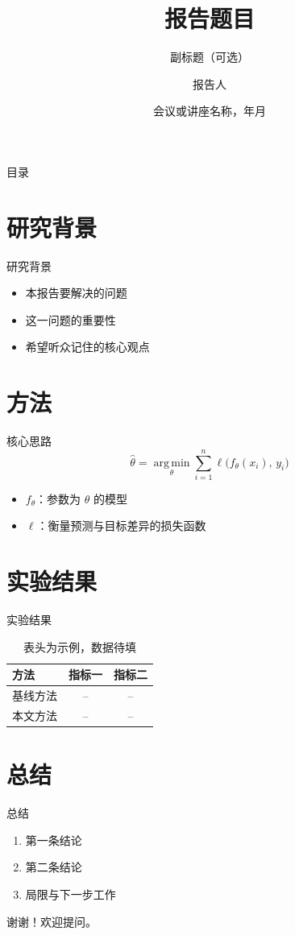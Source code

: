 \documentclass[UTF8,fontset=fandol,aspectratio=169]{ctexbeamer}
\title{报告题目}
\subtitle{副标题（可选）}
\author{报告人}
\institute{单位名称}
\date{会议或讲座名称，年月}
\begin{document}
\begin{frame}
  \titlepage
\end{frame}

\begin{frame}{目录}
  \tableofcontents
\end{frame}

\section{研究背景}
\begin{frame}{研究背景}
  \begin{itemize}
    \item 本报告要解决的问题
    \item 这一问题的重要性
    \item 希望听众记住的核心观点
  \end{itemize}
\end{frame}

\section{方法}
\begin{frame}{核心思路}
  \begin{equation}
    \hat{\theta} = \operatorname*{arg\,min}_{\theta}
      \sum_{i=1}^{n} \ell\bigl(f_{\theta}(x_i),\, y_i\bigr)
  \end{equation}
  \begin{itemize}
    \item $f_{\theta}$：参数为 $\theta$ 的模型
    \item $\ell$：衡量预测与目标差异的损失函数
  \end{itemize}
\end{frame}

\section{实验结果}
\begin{frame}{实验结果}
  \begin{table}
    \centering
    \begin{tabular}{lcc}
      \toprule
      方法     & 指标一 & 指标二 \\
      \midrule
      基线方法 & --     & --     \\
      本文方法 & --     & --     \\
      \bottomrule
    \end{tabular}
    \caption{表头为示例，数据待填}
  \end{table}
\end{frame}

\section{总结}
\begin{frame}{总结}
  \begin{enumerate}
    \item 第一条结论
    \item 第二条结论
    \item 局限与下一步工作
  \end{enumerate}
\end{frame}

\begin{frame}
  \centering
  \Large 谢谢！欢迎提问。
\end{frame}
\end{document}
